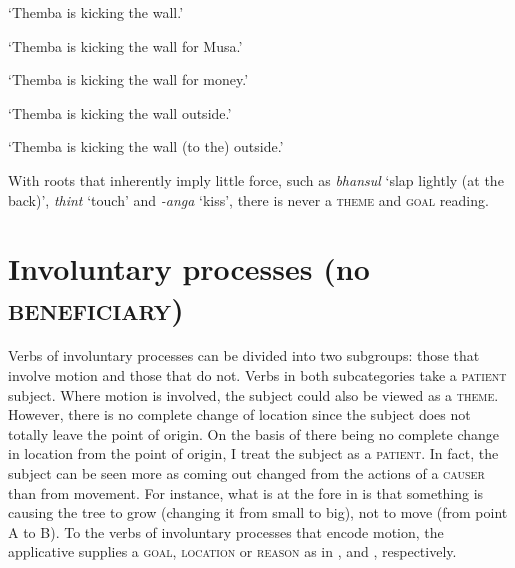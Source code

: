 \documentclass[output=paper]{langsci/langscibook}
\begin{document}
\glt ‘Themba is kicking the wall.’


\glt ‘Themba is kicking the wall for Musa.’


\glt ‘Themba is kicking the wall for money.’


\glt ‘Themba is kicking the wall outside.’


\glt ‘Themba is kicking the wall (to the) outside.’
\z
\z

With roots that inherently imply little force, such as \textit{bhansul} ‘slap lightly (at the back)’, \textit{thint} ‘touch’ and \textit{-anga} ‘kiss’, there is never a \textsc{theme} and \textsc{goal} reading.

\section{Involuntary processes (no \textsc{beneficiary})}\label{sec:sibanda:}

Verbs of involuntary processes can be divided into two subgroups: those that involve motion and those that do not. Verbs in both subcategories take a \textsc{patient} subject. Where motion is involved, the subject could also be viewed as a \textsc{theme}. However, there is no complete change of location since the subject does not totally leave the point of origin. On the basis of there being no complete change in location from the point of origin, I treat the subject as a \textsc{patient}. In fact, the subject can be seen more as coming out changed from the actions of a \textsc{causer} than from movement. For instance, what is at the fore in  is that something is causing the tree to grow (changing it from small to big), not to move (from point A to B). To the verbs of involuntary processes that encode motion, the applicative supplies a \textsc{goal}, \textsc{location} or \textsc{reason} as in ,  and , respectively.
\end{document}

